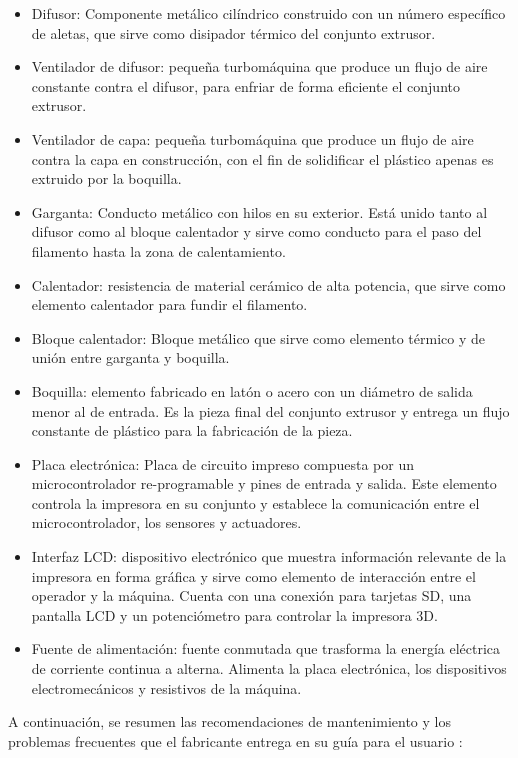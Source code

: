 \begin{itemize}
\item Difusor: Componente metálico cilíndrico construido con un número específico de aletas, que sirve como disipador térmico del conjunto extrusor.
\item Ventilador de difusor: pequeña turbomáquina que produce un flujo de aire constante contra el difusor, para enfriar de forma eficiente el conjunto extrusor.
\item Ventilador de capa: pequeña turbomáquina que produce un flujo de aire contra la capa en construcción, con el fin de solidificar el plástico apenas es extruido por la boquilla.
\item Garganta: Conducto metálico con hilos en su exterior. Está unido tanto al difusor como al bloque calentador y sirve como conducto para el paso del filamento hasta la zona de calentamiento.
\item Calentador: resistencia de material cerámico de alta potencia, que sirve como elemento calentador para fundir el filamento.
\item Bloque calentador: Bloque metálico que sirve como elemento térmico y de unión entre garganta y boquilla.
\item Boquilla: elemento fabricado en latón o acero con un diámetro de salida menor al de entrada. Es la pieza final del conjunto extrusor y entrega un flujo constante de plástico para la fabricación de la pieza.
\item Placa electrónica: Placa de circuito impreso compuesta por un microcontrolador re-programable y pines de entrada y salida. Este elemento controla la impresora en su conjunto y establece la comunicación entre el microcontrolador, los sensores y actuadores.
\item Interfaz LCD: dispositivo electrónico que muestra información relevante de la impresora en forma gráfica y sirve como elemento de interacción entre el operador y la máquina. Cuenta con una conexión para tarjetas SD, una pantalla LCD y un potenciómetro para controlar la impresora 3D. 
\item Fuente de alimentación: fuente conmutada que trasforma la energía eléctrica de corriente continua a alterna. Alimenta la placa electrónica, los dispositivos electromecánicos y resistivos de la máquina. 
\end{itemize}

A continuación, se resumen las recomendaciones de mantenimiento y los problemas frecuentes que el fabricante entrega en su guía para el usuario \citep{germanreprap2019}:

